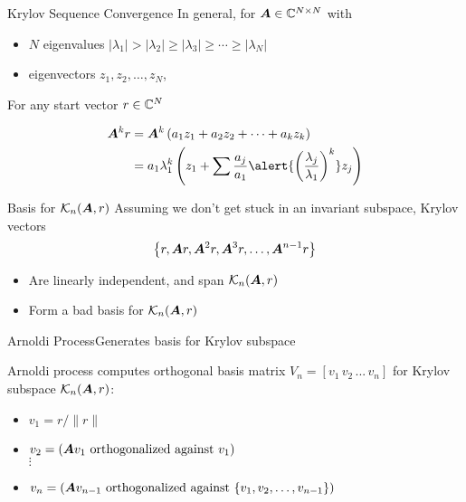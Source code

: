\documentclass{beamer}
\begin{document}
\begin{frame}{Krylov Sequence Convergence}
In general, for $\bm{A}\in\mathbb{C}^{ N\times N }$ with 
\begin{itemize}
\item $N$ eigenvalues $|\lambda_1| > |\lambda_2| \geq |\lambda_3| \geq\cdots \geq |\lambda_N|$

\item eigenvectors $z_1,z_2,\ldots,z_N$, 
\end{itemize}

\bigskip
For any start vector $r\in\mathbb{C}^N$

\begin{align*}
\A^k r &= \A^k \left(a_1 z_1 + a_2 z_2 + \cdots + a_k z_k \right)\\
&= a_1\lambda_1^k\left( z_1 + \sum\frac{a_j}{a_1}\alert{\left( \frac{\lambda_j}{\lambda_1} \right)^k} z_j \right)
\end{align*}
\end{frame}


\begin{frame}{Basis for $\mathcal{K}_{n}({\bm{A}},{r})$}
Assuming we don't get stuck in an invariant subspace, Krylov vectors 
\[
\left\{ r, \bm{A} r,  \bm{A}^2r, \bm{A}^3r, \ldots, \bm{A}^{n-1}r   \right\}
\]

\bigskip
\begin{itemize}
\item Are linearly independent, and span $\mathcal{K}_{n}({\bm{A}},{r})$

\medskip
\item Form a bad basis for $\mathcal{K}_{n}({\bm{A}},{r})$
\end{itemize}
\end{frame}


\begin{frame}{Arnoldi Process}{Generates basis for Krylov subspace}
\bigskip

\bigskip
Arnoldi process computes orthogonal basis matrix 
$V_n = \left[ v_1\, v_2\, ...\, v_n \right]$ for Krylov subspace $\mathcal{K}_{n}({\bm{A}},{r})$:
  
  \medskip
  \begin{itemize}
	   \item $v_1 = r/\|r\|$
	   \item $v_2 = \left(\A v_1\ \text{orthogonalized against}\  v_1\right)$
	   \\ $\vdots$ 
	   \item $v_n = \left(\bm{A} v_{n-1}\  \text{orthogonalized against}\  
			      \{v_1,v_2,\ldots ,v_{n-1}\}\right)$	
   \end{itemize}
\end{frame}
\end{document}
